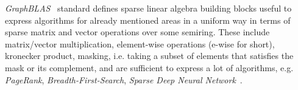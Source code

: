 \documentclass[acmsmall,review,nonacm]{acmart}\settopmatter{printfolios=true,printccs=false,printacmref=false}
\begin{document}
\emph{GraphBLAS}~\cite{buluc2017graphblas} standard defines sparse linear algebra building blocks useful to express algorithms for already mentioned areas in a uniform way in terms of sparse matrix and vector operations over some semiring. These include matrix/vector multiplication, element-wise operations (e-wise for short), kronecker product, masking, i.e. taking a subset of elements that satisfies the mask or its complement, and are sufficient to express a lot of algorithms, e.g. \emph{PageRank}, \emph{Breadth-First-Search}, \emph{Sparse Deep Neural Network}~\cite{SparseDNN}.

\end{document}
